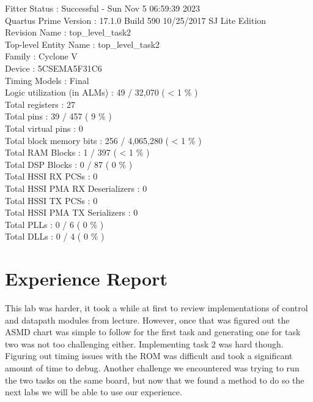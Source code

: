 \documentclass[11pt, titlepage]{article}
\begin{document}
\begin{description}
                    Fitter Status : Successful - Sun Nov  5 06:59:39 2023 \\
                    Quartus Prime Version : 17.1.0 Build 590 10/25/2017 SJ  Lite Edition \\
                    Revision Name : top\_level\_task2 \\
                    Top-level Entity Name : top\_level\_task2 \\
                    Family : Cyclone V \\
                    Device : 5CSEMA5F31C6 \\
                    Timing Models : Final \\
                    Logic utilization (in ALMs) : 49 / 32,070 ( < 1 \% ) \\
                    Total registers : 27 \\
                    Total pins : 39 / 457 ( 9 \% ) \\
                    Total virtual pins : 0 \\
                    Total block memory bits : 256 / 4,065,280 ( < 1 \% ) \\
                    Total RAM Blocks : 1 / 397 ( < 1 \% ) \\
                    Total DSP Blocks : 0 / 87 ( 0 \% ) \\
                    Total HSSI RX PCSs : 0 \\
                    Total HSSI PMA RX Deserializers : 0 \\
                    Total HSSI TX PCSs : 0 \\
                    Total HSSI PMA TX Serializers : 0 \\
                    Total PLLs : 0 / 6 ( 0 \% ) \\
                    Total DLLs : 0 / 4 ( 0 \% ) \\
            \end{description}
            
    \newpage
    \section{Experience Report}
        This lab was harder, it took a while at first to review implementations of control and datapath modules from lecture. However, once that was figured out the ASMD chart was simple to follow for the first task and generating one for task two was not too challenging either. Implementing task 2 was hard though. Figuring out timing issues with the ROM was difficult and took a significant amount of time to debug. Another challenge we encountered was trying to run the two tasks on the same board, but now that we found a method to do so the next labs we will be able to use our experience.
    
\end{document}
